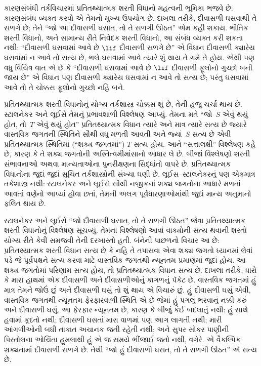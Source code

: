 કારણસંબંધી તર્કવિચારમાં પ્રતિતથ્યાત્મક શરતી વિધાનો મહત્વની ભૂમિકા
ભજવે છે: કારણસંબંધ વ્યક્ત કરવો એ તેમનો મુખ્ય ઉપયોગ છે. દાખલા તરીકે,
દીવાસળી ઘસવાથી તે સળગે છે; તેને ``જો આ દીવાસળી ઘસાત, તો તે સળગી
ઊઠત'' એમ કહી શકાય. ભૌતિક શરતી વિધાનો, અને સામાન્ય રીતે નિવેદક
શરતી વિધાનો, આ સંબંધ વ્યક્ત કરી શકતા નથી: ``દીવાસળી ઘસવામાં આવે છે
$\lif$ દીવાસળી સળગે છે'' એ વિધાન દીવાસળી ક્યારેય ઘસવામાં ન આવે
તો સત્ય છે, ભલે ઘસવામાં આવે ત્યારે શું થાય તે ગમે તે હોય. એથી પણ
વધુ વિચિત્ર વાત એ છે કે ``દીવાસળી ઘસવામાં આવે છે $\lif$ દીવાસળી
ફૂલોનો ગુચ્છો બની જાય છે'' એ વિધાન પણ દીવાસળી ક્યારેય ઘસવામાં ન
આવે તો સત્ય છે; પરંતુ ઘસવામાં આવે તો તે ચોક્કસ ફૂલોનો ગુચ્છો નહિ
બને.

પ્રતિતથ્યાત્મક શરતી વિધાનોનું યોગ્ય તર્કશાસ્ત્ર ચોક્કસ શું છે, તેની
હજુ ચર્ચા થાય છે. સ્ટાલનેકર અને લૂઈસે તેમનું પ્રભાવશાળી વિશ્લેષણ
આપ્યું. તેમના મતે ``જો~$S$ એવું થયું હોત, તો~$T$ એવું થયું હોત''
પ્રતિતથ્યાત્મક વિધાન ત્યારે અને માત્ર ત્યારે સત્ય છે જ્યારે વાસ્તવિક
જગતની સ્થિતિને સૌથી વધુ મળતી આવતી અને જ્યાં~$S$ સત્ય છે એવી
પ્રતિતથ્યાત્મક સ્થિતિમાં (``શક્ય જગતમાં'') $T$ સત્ય હોય. આને
``સત્તાલક્ષી'' વિશ્લેષણ કહે છે, કારણ કે તે શક્ય જગતોની
અસ્તિત્વમીમાંસાનો આધાર લે છે. બીજાં વિશ્લેષણો શરતી સંભાવનાઓ અથવા
માન્યતાઓના પુનરીક્ષણના સિદ્ધાંતો વાપરે છે. પ્રતિતથ્યાત્મક વિધાનોના
જુદાં જુદાં સૂચિત તર્કશાસ્ત્રોની સંખ્યા ઘણી છે. લૂઈસ--સ્ટાલનેકરનું
પણ એકમાત્ર તર્કશાસ્ત્ર નથી: સ્ટાલનેકર અને લૂઈસે સૌથી નજીકનાં શક્ય
જગતોના આધારે મળતાં આવતાં વર્ણનો આપ્યાં હોવા છતાં, તેમની અલગ
પૂર્વધારણાઓમાંથી જુદાં માન્ય અનુમાનો ફલિત થાય છે.
\endgroup


\OLEndChapterHook
\endgroup


\begingroup
\makeatletter{}\makeatother

\label{guunit:OLP-0522}


\begingroup
\makeatletter{}\makeatother


\label{guunit:OLP-0523}


સ્ટાલનેકર અને લૂઈસે ``જો દીવાસળી ઘસાત, તો તે સળગી ઊઠત'' જેવા
પ્રતિતથ્યાત્મક શરતી વિધાનોનું વિશ્લેષણ સૂચવ્યું. તેમનાં વિશ્લેષણો
આવાં વાક્યોની સત્ય થવાની શરતો યોગ્ય રીતે કેવી સમજવી તેની દરખાસ્તો
હતી. બંનેની પાછળનો વિચાર આ છે: પ્રતિતથ્યાત્મક શરતી વિધાન સત્ય છે
કે નહિ તે તપાસવા એવા શક્ય જગતો ધ્યાનમાં લેવાં પડે જે પૂર્વપક્ષને
સત્ય કરવા માટે વાસ્તવિક જગતથી ન્યૂનતમ પ્રમાણમાં જુદાં હોય. આ શક્ય
જગતોમાં પરિણામ સત્ય હોય, તો પ્રતિતથ્યાત્મક વિધાન સત્ય છે. દાખલા
તરીકે, ધારો કે મારા હાથમાં એક દીવાસળી અને દીવાસળીઓનું કાગળનું પૅકેટ
છે. વાસ્તવિક જગતમાં હું માત્ર તેમને જોઉં છું અને દીવાસળી ઘસું તો
શું થાય એ વિચારું છું. હું દીવાસળી ઘસું એવી, વાસ્તવિક જગતથી
ન્યૂનતમ ફેરફારવાળી સ્થિતિ એ છે જેમાં હું પગલું ભરવાનું નક્કી કરું
અને દીવાસળી ઘસું. આ ફેરફાર ન્યૂનતમ છે, કારણ કે બીજું કંઈ બદલાતું
નથી: હું સાથે હવામાં કૂદતો નથી; દીવાસળી ઘસતાં મારા વાળમાં પણ આગ
લાગતી નથી; મારી આંગળીઓની બધી તાકાત અચાનક જતી રહેતી નથી; અને
સુપર સોકર પાણીની પિસ્તોલના ઓચિંતા હુમલાથી હું એ જ સમયે ભીંજાઈ
જતો નથી, વગેરે. એ વૈકલ્પિક શક્યતામાં દીવાસળી સળગે છે. તેથી
``જો હું દીવાસળી ઘસત, તો તે સળગી ઊઠત'' એ સત્ય છે.

